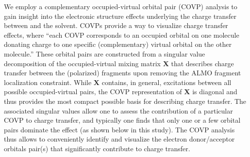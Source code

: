 We employ a complementary occupied-virtual orbital pair (COVP) analysis\cite{Khaliullin2008} to gain insight into the electronic structure effects underlying the charge transfer between  and the solvent. COVPs provide a way to visualize charge transfer effects, where ``each COVP corresponds to an occupied orbital on one molecule donating charge to one specific (complementary) virtual orbital on the other molecule.''\cite{Khaliullin2009} These orbital pairs are constructed from a singular value decomposition of the occupied-virtual mixing matrix ${\mathbf X}$ that describes charge transfer between the (polarized) fragments upon removing the ALMO fragment localization constraint.  While ${\mathbf X}$ contains, in general, excitations between all possible occupied-virtual pairs, the COVP representation of ${\mathbf X}$ is diagonal and thus provides the most compact possible basis for describing charge transfer.  The associated singular values allow one to assess the contribution of a particular COVP to charge transfer, and typically one finds that only one or a few orbital pairs dominate the effect (as shown below in this study). The COVP analysis thus allows to conveniently identify and visualize the electron donor/acceptor orbitals pair(s) that significantly contribute to charge transfer.

